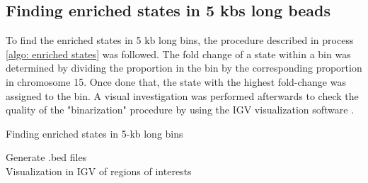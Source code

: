 \subsection{Finding enriched states in 5 kbs long beads} \label{methods: finding enriched states}

To find the enriched states in 5 kb long bins, the procedure described in process \ref{algo: enriched states} was followed. The fold change of a state within a bin was determined by dividing the proportion in the bin by the corresponding proportion in chromosome 15. Once done that, the state with the highest fold-change was assigned to the bin. A visual investigation was performed afterwards to check the quality of the "binarization" procedure by using the IGV visualization software
\cite{robinsonIgvJsEmbeddable2020}.

\begin{algorithm}
    \caption{Finding enriched states in 5-kb long bins}\label{algo: enriched states}
    Generate .bed files\\
    Visualization in IGV of regions of interests\\
\end{algorithm}

